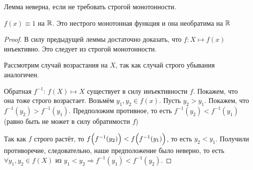 \begin{note}
    Лемма неверна, если не требовать строгой монотонности.
\end{note}
\begin{example}
    $ f(x) \equiv 1 $ на $\mathbb{R}$. Это нестрого монотонная функция и она необратима на $\mathbb{R}$
\end{example}
\begin{proof}
    В силу предыдущей леммы достаточно доказать, что $f: X \mapsto f(x)$ инъективно. Это следует из строгой монотонности.

    Рассмотрим случай возрастания на $X$, так как случай строго убывания аналогичен.

    Обратная $f^{-1}$: $f(X) \mapsto X$ существует в силу инъективности $f$. Покажем, что она тоже строго возрастает. Возьмём $y_{1}, y_{2} \in f(x)$. Пусть $y_{2} > y_{1}$. Покажем, что $f^{-1} (y_{2}) > f^{-1}(y_{1})$. Предположим противное, то есть $f^{-1} (y_{2}) < f^{-1}(y_{1})$ (равно быть не может в силу обратимости $f$)

    Так как $f$ строго растёт, то $f\Bigl(f^{-1}(y_{2})\Bigr) < f\Bigl(f^{-1}(y_{1})\Bigr)$, то есть $y_{2} < y_{1}$. Получили противоречие, следовательно, наше предположение было неверно, то есть $\forall y_{1}, y_{2} \in f(X)$ из $y_{1} < y_{2} \Rightarrow f^{-1}(y_{1}) < f^{-1}(y_{2}).$
\end{proof}

